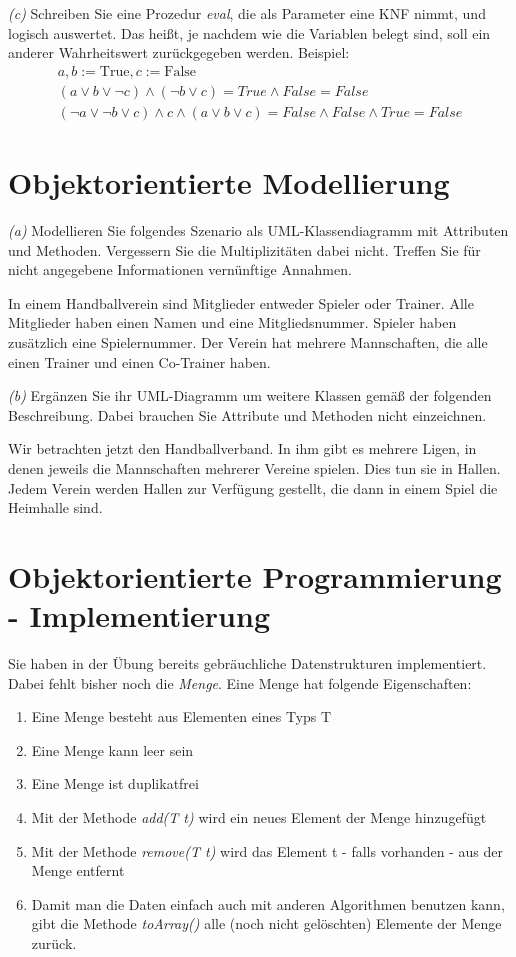 \documentclass[11pt,a4paper,oneside,ngerman]{scrbook}
\begin{document}
\emph{(c)} Schreiben Sie eine Prozedur \emph{eval}, die als Parameter eine KNF nimmt, und logisch auswertet. Das heißt, je nachdem wie die Variablen belegt sind, soll ein anderer Wahrheitswert zurückgegeben werden. Beispiel:
\begin{gather*}
  a, b := \text{True}, c := \text{False} \\
  (a \lor b \lor \neg c) \land ( \neg b \lor c) = True \land False = False \\
  (\neg a \lor \neg b \lor c ) \land c \land (a \lor b \lor c) = False \land False \land True = False
\end{gather*}




\newpage

\section{Objektorientierte Modellierung}
\emph{(a)} Modellieren Sie folgendes Szenario als UML-Klassendiagramm mit Attributen und Methoden. Vergessern Sie die Multiplizitäten dabei nicht. Treffen Sie für nicht angegebene Informationen vernünftige Annahmen.

In einem Handballverein sind Mitglieder entweder Spieler oder Trainer. Alle Mitglieder haben einen Namen und eine Mitgliedsnummer. Spieler haben zusätzlich eine Spielernummer. Der Verein hat mehrere Mannschaften, die alle einen Trainer und einen Co-Trainer haben.


\newpage

\emph{(b)} Ergänzen Sie ihr UML-Diagramm um weitere Klassen gemäß der folgenden Beschreibung. Dabei brauchen Sie Attribute und Methoden nicht einzeichnen.

Wir betrachten jetzt den Handballverband. In ihm gibt es mehrere Ligen, in denen jeweils die Mannschaften mehrerer Vereine spielen. Dies tun sie in Hallen. Jedem Verein werden Hallen zur Verfügung gestellt, die dann in einem Spiel die Heimhalle sind.


\newpage

\section{Objektorientierte Programmierung - Implementierung}
Sie haben in der Übung bereits gebräuchliche Datenstrukturen implementiert. Dabei fehlt bisher noch die \emph{Menge}.
Eine Menge hat folgende Eigenschaften:

\begin{enumerate}
  \item Eine Menge besteht aus Elementen eines Typs T
  \item Eine Menge kann leer sein
  \item Eine Menge ist duplikatfrei
  \item Mit der Methode \emph{add(T t)} wird ein neues Element der Menge hinzugefügt
  \item Mit der Methode \emph{remove(T t)} wird das Element t - falls vorhanden - aus der Menge entfernt
  \item Damit man die Daten einfach auch mit anderen Algorithmen benutzen kann, gibt die Methode \emph{toArray()} alle (noch nicht gelöschten) Elemente der Menge zurück.
\end{enumerate}
\end{document}
